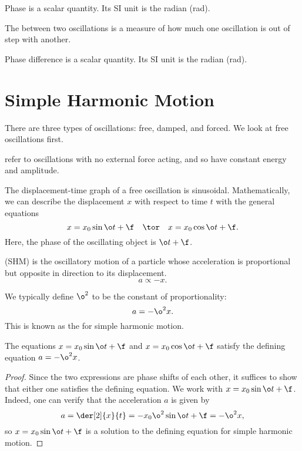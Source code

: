 Phase is a scalar quantity. Its SI unit is the radian (rad).

\begin{definition}
    The  between two oscillations is a measure of how much one oscillation is out of step with another.
\end{definition}

Phase difference is a scalar quantity. Its SI unit is the radian (rad).

\section{Simple Harmonic Motion}

There are three types of oscillations: free, damped, and forced. We look at free oscillations first.

\begin{definition}
     refer to oscillations with no external force acting, and so have constant energy and amplitude.
\end{definition}

The displacement-time graph of a free oscillation is sinusoidal. Mathematically, we can describe the displacement $x$ with respect to time $t$ with the general equations \[x = x_0 \sin{\o t + \f} \quad \tor \quad x = x_0 \cos{\o t + \f}.\] Here, the phase of the oscillating object is $\o t + \f$.

\begin{definition}
     (SHM) is the oscillatory motion of a particle whose acceleration is proportional but opposite in direction to its displacement. \[a \propto -x.\]
\end{definition}

We typically define $\o^2$ to be the constant of proportionality: \[a = -\o^2 x.\] This is known as the  for simple harmonic motion.

\begin{proposition}
    The equations $x = x_0 \sin{\o t + \f}$ and $x = x_0 \cos{\o t + \f}$ satisfy the defining equation $a = -\o^2 x$.
\end{proposition}
\begin{proof}
    Since the two expressions are phase shifts of each other, it suffices to show that either one satisfies the defining equation. We work with $x = x_0\sin{\o t + \f}$. Indeed, one can verify that the acceleration $a$ is given by \[a = \der[2]{x}{t} = -x_0 \o^2 \sin{\o t + \f} = -\o^2 x,\] so $x = x_0 \sin{\o t + \f}$ is a solution to the defining equation for simple harmonic motion.
\end{proof}


